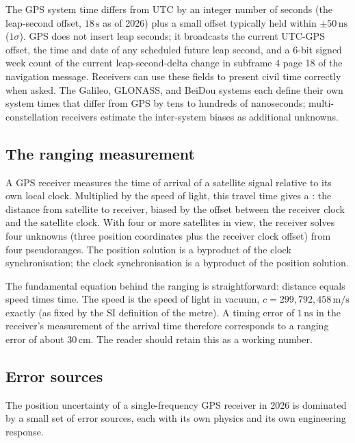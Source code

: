 The GPS system time differs from UTC by an integer number of
seconds (the leap-second offset, $18\,\si{\second}$ as of 2026)
plus a small offset typically held within $\pm 50\,\si{\nano
\second}$ ($1\sigma$). GPS does not insert leap seconds; it
broadcasts the current UTC-GPS offset, the time and date of any
scheduled future leap second, and a 6-bit signed week count of
the current leap-second-delta change in subframe 4 page 18 of
the navigation message. Receivers can use these fields to present
civil time correctly when asked. The Galileo, GLONASS, and BeiDou
systems each define their own system times that differ from GPS
by tens to hundreds of nanoseconds; multi-constellation receivers
estimate the inter-system biases as additional unknowns.

\subsection{The ranging measurement}

A GPS receiver measures the time of arrival of a satellite signal
relative to its own local clock. Multiplied by the speed of light,
this travel time gives a : the distance from
satellite to receiver, biased by the offset between the receiver
clock and the satellite clock. With four or more satellites in
view, the receiver solves four unknowns (three position
coordinates plus the receiver clock offset) from four pseudoranges.
The position solution is a byproduct of the clock synchronisation;
the clock synchronisation is a byproduct of the position solution.

The fundamental equation behind the ranging is straightforward:
distance equals speed times time. The speed is the speed of light
in vacuum, $c = 299{,}792{,}458 \,\si{\meter\per\second}$ exactly
(as fixed by the SI definition of the metre). A timing error of
$1 \,\si{\nano\second}$ in the receiver's measurement of the
arrival time therefore corresponds to a ranging error of about
$30 \,\si{\centi\meter}$. The reader should retain this as a
working number.

\subsection{Error sources}

The position uncertainty of a single-frequency GPS receiver in
2026 is dominated by a small set of error sources, each with its
own physics and its own engineering response.

